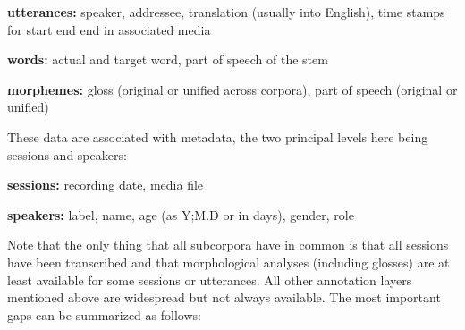 \documentclass[a4paper, 11pt]{book}
\begin{document}
\begin{itemize*}
	\item \textbf{utterances:} speaker, addressee, translation (usually into English), time stamps for start end end in associated media
	\item \textbf{words:} actual and target word, part of speech of the stem
	\item \textbf{morphemes:} gloss (original or unified across corpora), part of speech (original or unified)
\end{itemize*}

These data are associated with metadata, the two principal levels here being sessions and speakers: 

\begin{itemize*}
	\item \textbf{sessions:} recording date, media file
	\item \textbf{speakers:} label, name, age (as Y;M.D or in days), gender, role
\end{itemize*}

Note that the only thing that all subcorpora have in common is that all sessions have been transcribed and that morphological analyses (including glosses) are at least available for some sessions or utterances. All other annotation layers mentioned above are widespread but not always available. The most important gaps can be summarized as follows:
\end{document}
